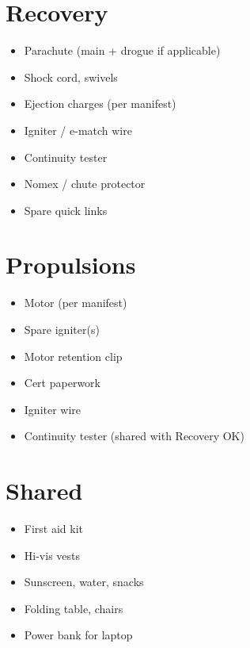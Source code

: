 \documentclass[11pt,a4paper,oneside]{report}
\begin{document}
\section{Recovery}
\begin{itemize}
  \item Parachute (main + drogue if applicable)
  \item Shock cord, swivels
  \item Ejection charges (per manifest)
  \item Igniter / e-match wire
  \item Continuity tester
  \item Nomex / chute protector
  \item Spare quick links
\end{itemize}

\section{Propulsions}
\begin{itemize}
  \item Motor (per manifest)
  \item Spare igniter(s)
  \item Motor retention clip
  \item Cert paperwork
  \item Igniter wire
  \item Continuity tester (shared with Recovery OK)
\end{itemize}

\section{Shared}
\begin{itemize}
  \item First aid kit
  \item Hi-vis vests
  \item Sunscreen, water, snacks
  \item Folding table, chairs
  \item Power bank for laptop
\end{itemize}
\end{document}
